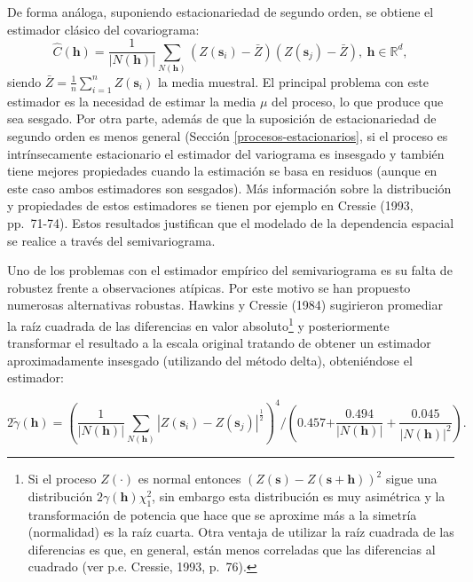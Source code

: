 \documentclass[
  spanish,
]{book}
\theoremstyle{break}
\theoremstyle{definition}
\theoremstyle{definition}
\theoremstyle{definition}
\theoremstyle{definition}
\theoremstyle{remark}
\begin{document}
De forma análoga, suponiendo estacionariedad de segundo orden, se obtiene el estimador clásico del covariograma:
\[\hat{C} (\mathbf{h}) = \dfrac{1}{\left| N(\mathbf{h})\right| }
\sum\limits_{N(\mathbf{h})}\left( Z(\mathbf{s}_{i})-\bar{Z} \right)
\left( Z(\mathbf{s}_{j})-\bar{Z} \right),\ \mathbf{h}\in \mathbb{R}^{d},\]
siendo \(\bar{Z} =\frac{1}{n} \sum_{i=1}^{n}Z(\mathbf{s}_{i})\) la media muestral.
El principal problema con este estimador es la necesidad de estimar la media \(\mu\) del proceso, lo que produce que sea sesgado.
Por otra parte, además de que la suposición de estacionariedad de segundo orden es menos general (Sección \ref{procesos-estacionarios}, si el proceso es intrínsecamente estacionario el estimador del variograma es insesgado y también tiene mejores propiedades cuando la estimación se basa en residuos (aunque en este caso ambos estimadores son sesgados).
Más información sobre la distribución y propiedades de estos estimadores se tienen por ejemplo en Cressie (1993, pp.~71-74).
Estos resultados justifican que el modelado de la dependencia espacial se realice a través del semivariograma.

Uno de los problemas con el estimador empírico del semivariograma es su falta de robustez frente a observaciones atípicas.
Por este motivo se han propuesto numerosas alternativas robustas.
Hawkins y Cressie (1984) sugirieron promediar la raíz cuadrada de las diferencias en valor absoluto\footnote{Si el proceso \(Z(\cdot)\) es normal entonces
  \((Z(\mathbf{s})-Z(\mathbf{s}+\mathbf{h}))^2\) sigue una distribución \(2\gamma(\mathbf{h})\chi_1^2\), sin embargo esta distribución es muy asimétrica y la transformación de potencia que hace que se aproxime más a la simetría (normalidad) es la raíz cuarta. Otra ventaja de utilizar la raíz cuadrada de las diferencias es que, en general, están menos correladas que las diferencias al cuadrado (ver p.e. Cressie, 1993, p.~76).} y posteriormente transformar el resultado a la escala original tratando de obtener un estimador aproximadamente insesgado (utilizando del método delta), obteniéndose el estimador:

\[2\tilde{\gamma}(\mathbf{h}) = \left( \dfrac{1}{\left| N(\mathbf{h})\right| }
\sum\limits_{N(\mathbf{h})}\left| Z(\mathbf{s}_{i})-Z(\mathbf{s}_{j}
)\right|^{\frac{1}{2} } \right)^{4} /\left( \text{0.457+}
\dfrac{\text{0.494} }{\left| N(\mathbf{h})\right| } +\dfrac{\text{0.045}
}{\left| N(\mathbf{h})\right|^2 } \right).\]
\end{document}
